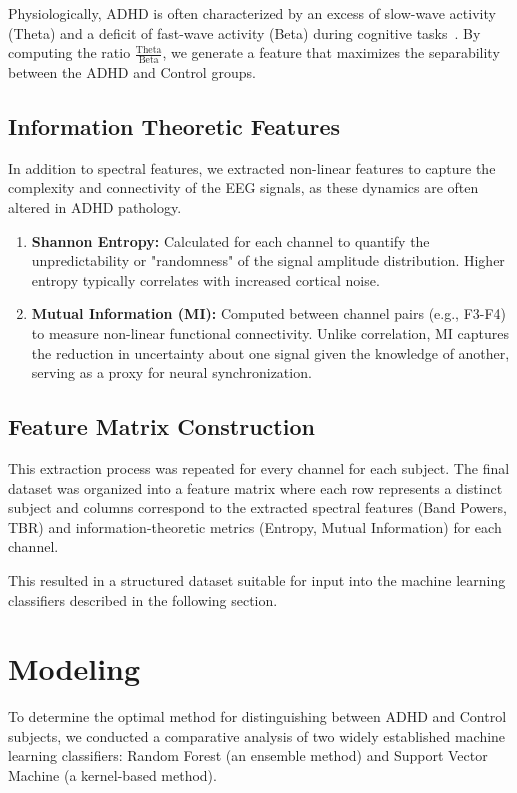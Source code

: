 \documentclass[11pt,a4paper]{article}
\begin{document}
Physiologically, ADHD is often characterized by an excess of slow-wave activity (Theta) and a deficit of fast-wave activity (Beta) during 
cognitive tasks~\cite{clarke2002eeg}. By computing the ratio $\frac{\text{Theta}}{\text{Beta}}$, we generate a feature that maximizes the 
separability between the ADHD and Control groups.

\subsection{Information Theoretic Features}
In addition to spectral features, we extracted non-linear features to capture the complexity and connectivity of the EEG signals, as these dynamics are often altered in ADHD pathology.

\begin{enumerate}
    \item \textbf{Shannon Entropy:} 
    Calculated for each channel to quantify the unpredictability or "randomness" of the signal amplitude distribution. Higher entropy typically correlates with increased cortical noise.
    
    \item \textbf{Mutual Information (MI):} 
    Computed between channel pairs (e.g., F3-F4) to measure non-linear functional connectivity. Unlike correlation, MI captures the reduction in uncertainty about one signal given the knowledge of another, serving as a proxy for neural synchronization.
\end{enumerate}


\subsection{Feature Matrix Construction}
This extraction process was repeated for every channel for each subject. The final dataset was organized into a feature matrix where each row 
represents a distinct subject and columns correspond to the extracted spectral features (Band Powers, TBR) and information-theoretic metrics 
(Entropy, Mutual Information) for each channel.

This resulted in a structured dataset suitable for input into the machine learning classifiers described in the following section.


\section{Modeling}\label{sec:modeling}
To determine the optimal method for distinguishing between ADHD and Control subjects, we conducted a comparative analysis of two widely 
established machine learning classifiers: Random Forest (an ensemble method) and Support Vector Machine (a kernel-based method).
\end{document}
